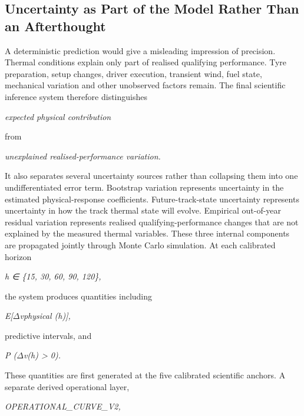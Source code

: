 \subsection{Uncertainty as Part of the Model Rather Than an Afterthought}
A deterministic prediction would give a misleading impression of precision. Thermal conditions explain only part of realised qualifying performance. Tyre preparation, setup changes, driver execution, transient wind, fuel state, mechanical variation and other unobserved factors remain. The final scientific inference system therefore distinguishes

\begin{center}\textit{expected physical contribution}\end{center}

from

\begin{center}\textit{unexplained realised-performance variation.}\end{center}

It also separates several uncertainty sources rather than collapsing them into one undifferentiated error term. Bootstrap variation represents uncertainty in the estimated physical-response coefficients. Future-track-state uncertainty represents uncertainty in how the track thermal state will evolve. Empirical out-of-year residual variation represents realised qualifying-performance changes that are not explained by the measured thermal variables. These three internal components are propagated jointly through Monte Carlo simulation. At each calibrated horizon

\begin{center}\textit{h ∈ \{15, 30, 60, 90, 120\},}\end{center}

the system produces quantities including

\begin{center}\textit{E[\ensuremath{\Delta}vphysical (h)],}\end{center}

predictive intervals, and

\begin{center}\textit{P (\ensuremath{\Delta}v(h) > 0).}\end{center}

These quantities are first generated at the five calibrated scientific anchors. A separate derived operational layer,

\begin{center}\textit{OPERATIONAL\_CURVE\_V2,}\end{center}

